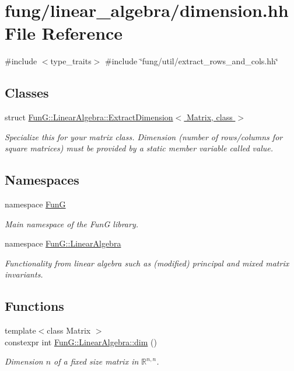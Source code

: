\hypertarget{dimension_8hh}{\section{fung/linear\-\_\-algebra/dimension.hh \-File \-Reference}
\label{dimension_8hh}
}
{\ttfamily \#include $<$type\-\_\-traits$>$}\*
{\ttfamily \#include \char`\"{}fung/util/extract\-\_\-rows\-\_\-and\-\_\-cols.\-hh\char`\"{}}\*
\subsection*{\-Classes}
\begin{DoxyCompactItemize}
\item 
struct \hyperlink{structFunG_1_1LinearAlgebra_1_1ExtractDimension}{\-Fun\-G\-::\-Linear\-Algebra\-::\-Extract\-Dimension$<$ Matrix, class $>$}
\begin{DoxyCompactList}\small\item\em \-Specialize this for your matrix class. \-Dimension (number of rows/columns for square matrices) must be provided by a static member variable called value. \end{DoxyCompactList}\end{DoxyCompactItemize}
\subsection*{\-Namespaces}
\begin{DoxyCompactItemize}
\item 
namespace \hyperlink{namespaceFunG}{\-Fun\-G}
\begin{DoxyCompactList}\small\item\em \-Main namespace of the \-Fun\-G library. \end{DoxyCompactList}\item 
namespace \hyperlink{namespaceFunG_1_1LinearAlgebra}{\-Fun\-G\-::\-Linear\-Algebra}
\begin{DoxyCompactList}\small\item\em \-Functionality from linear algebra such as (modified) principal and mixed matrix invariants. \end{DoxyCompactList}\end{DoxyCompactItemize}
\subsection*{\-Functions}
\begin{DoxyCompactItemize}
\item 
{\footnotesize template$<$class Matrix $>$ }\\constexpr int \hyperlink{namespaceFunG_1_1LinearAlgebra_a13a029820c29d530274ae94968d642d4}{\-Fun\-G\-::\-Linear\-Algebra\-::dim} ()
\begin{DoxyCompactList}\small\item\em \-Dimension $n$ of a fixed size matrix in $\mathbb{R}^{n,n}$. \end{DoxyCompactList}\end{DoxyCompactItemize}
